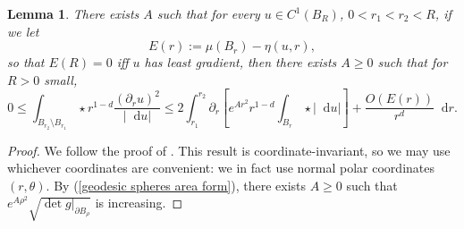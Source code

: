 \documentclass[reqno,11pt]{amsart}
\newcommand*\dif{\mathop{}\!\mathrm{d}}
\newtheorem{lemma}[theorem]{Lemma}
\theoremstyle{definition}
\numberwithin{equation}{section}
\begin{document}
\begin{lemma}\label{monotonicity lemma}
There exists $A$ such that for every $u \in C^1(B_R)$, $0 < r_1 < r_2 < R$, if we let
$$E(r) := \mu(B_r) - \eta(u, r),$$
so that $E(R) = 0$ iff $u$ has least gradient, then there exists $A \geq 0$ such that for $R > 0$ small,
\begin{equation}\label{monotonicity lemma eqn}
0 \leq \int_{B_{r_2} \setminus B_{r_1}} \star r^{1 - d}\frac{(\partial_ru)^2}{|\dif u|} \leq 2\int_{r_1}^{r_2} \partial_r \left[e^{Ar^2} r^{1-d}\int_{B_r} \star |\dif u|\right] + \frac{O(E(r))}{r^d} \dif r.
\end{equation}
\end{lemma}
\begin{proof}
We follow the proof of \cite[Lemma 5.8]{Giusti77}.
This result is coordinate-invariant, so we may use whichever coordinates are convenient: we in fact use normal polar coordinates $(r, \theta)$.
By (\ref{geodesic spheres area form}), there exists $A \geq 0$ such that $e^{A\rho^2} \sqrt{\det g|_{\partial B_\rho}}$ is increasing.


\end{proof}
\end{document}
